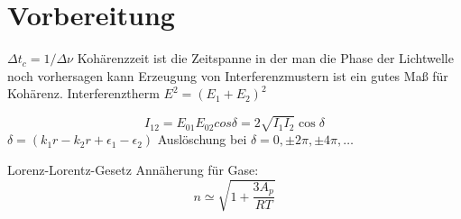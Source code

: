 \section{Vorbereitung}
$\Delta t_c  = 1/ \Delta \nu$
Kohärenzzeit ist die Zeitspanne in der man die Phase der Lichtwelle noch vorhersagen kann
Erzeugung von Interferenzmustern ist ein gutes Maß für Kohärenz.
Interferenztherm
$E^2 = (E_1 +E_2)^2$

$$I_{12} = E_{01}E_{02}cos{\delta} = 2 \sqrt{I_1 I_2} \cos{\delta}$$
$\delta = (k_1 r- k_2 r + \epsilon_1-\epsilon_2)$
Auslöschung bei $\delta= 0, \pm 2\pi,\pm4\pi,\dots$

Lorenz-Lorentz-Gesetz
Annäherung für Gase:
$$n \simeq \sqrt{1 + \frac{3A_p}{R T}} $$

